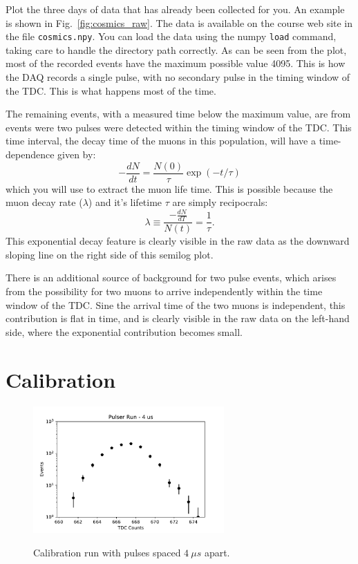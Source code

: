 \begin{plot} Plot the three days of data that has already been collected for you. An example is shown in Fig.~\ref{fig:cosmics_raw}.  The data is available on the course
web site in the file {\tt cosmics.npy}. You can load the data
using the numpy {\tt load} command, taking care to handle the
directory path correctly.  As can be seen from the plot, most of the
recorded events have the maximum possible value 4095.  This is how the
DAQ records a single pulse, with no secondary pulse in the timing
window of the TDC.  This is what happens most of the time. \end{plot}

The remaining events, with a measured time below the maximum value, are from events were two pulses were detected within the timing window of the TDC.  This time
interval, the decay time of the muons in this population, will have a
time-dependence given by:
\begin{displaymath}
-\frac{dN}{dt} = \frac{N(0)}{\tau} \exp(-t/\tau)
\end{displaymath}
which you will use to extract the muon life time.  This is possible because the muon decay rate ($\lambda$)
and it's lifetime $\tau$ are simply recipocrals:
\begin{displaymath}
\lambda \equiv \frac{-\frac{dN}{dT}}{N(t)} = \frac{1}{\tau}.
\end{displaymath}
This exponential decay feature is clearly visible in the raw data as the downward sloping line on the right side of this semilog plot.

There is an additional source of background for two pulse events, which arises from the possibility for two muons to arrive independently within the time window of the TDC.   Sine the arrival time of the two muons is independent, this contribution is flat in time, and is clearly visible in the raw data on the left-hand side, where the exponential contribution becomes small.

\section{Calibration}

\begin{figure}[htbp]
\begin{center}
{\includegraphics[width=0.65\textwidth]{figs/labs/muon/pulser_4_raw.pdf}}\\
\end{center}
\caption{\label{fig:pulser_raw}  Calibration run with pulses spaced $4~\mu s$ apart.}
\end{figure}

